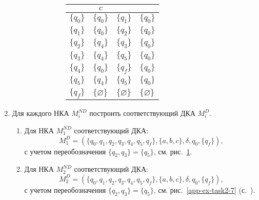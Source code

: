 \begin{enumerate}[label=(\roman{*})]
\begin{enumerate}
\begin{figure}
\begin{subfigure}[b]{.4\linewidth}
\begin{tabular}{llll}
				& \multicolumn{1}{c}{$c$} \\
				\midrule
				$\{q_0\}$       & $\{q_0\}$      		 & $\{q_1\}$     &$\{q_0\}$  \\
				$\{q_1\}$       & $\{q_0\}$    			 & $\{q_2\}$     &$\{q_0\}$ \\
				$\{q_2\}$       & $\{q_4\}$    			 & $\{q_3\}$     &$\{q_0\}$  \\
				$\{q_3\}$       & $\{q_4\}$    			 & $\{q_5\}$     &$\{q_0\}$  \\
				$\{q_4\}$       & $\{q_0\}$    			 & $\{q_f\}$     &$\{q_0\}$  \\
				$\{q_5\}$ 		& $\{q_4\}$    			 & $\{q_5\}$     &$\{q_0\}$  \\
				$\{q_f\}$       & $\{\varnothing\}$    	 & $\{\varnothing\}$     &$\{\varnothing\}$  \\
				\bottomrule
			\end{tabular}

\caption{}\label{app-ex-task2-5}
\end{subfigure}
\caption{}\label{app-ex-task2-6}
\end{figure}

	\end{enumerate}

	\item Для каждого НКА $M^{ND}_i$ построить соответствующий ДКА $M^D_i$.
		
	\begin{enumerate}
		
		\item Для НКА $M^{ND}_1$ соответствующий ДКА:
        \[
            M^{D}_1 = (\{q_0, q_1, q_2, q_3, q_4, q_5, q_f\}, \{a, b, c\}, \delta, q_0, \{q_f\}),
        \]
        с учетом переобозначения $\{q_2, q_3\} = \{q_5\}$, см. рис.~\ref{app-ex-task2-5}.
		
		\item Для НКА $M^{ND}_2$ соответствующий ДКА:
		\[
            M^{D}_2 = (\{q_0, q_1, q_2, q_3, q_4, q_5, q_f\}, \{a, b, c\}, \delta, q_0, \{q_f\}),
        \]
        с учетом переобозначения $\{q_2, q_3\} = \{q_5\}$, см. рис.~\ref{app-ex-task2-7} (с.~\pageref{app-ex-task2-7}).


\end{enumerate}
\end{enumerate}
